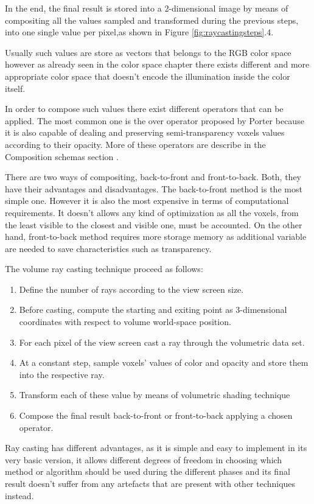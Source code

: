 \documentclass[12pt,a4paper]{extarticle}
\newcommand{\linespace}{\vspace{0pt}}
\begin{document}
In the end, the final result is stored into a 2-dimensional image by means of compositing all the values sampled and transformed during the previous steps, into one single value per pixel,as shown in Figure \ref{fig:raycastingsteps}.4.

Usually such values are store as vectors that belongs to the RGB color space%
however as already seen in the color space chapter there exists different and more appropriate color space that doesn't encode the illumination inside the color itself.
\linespace

In order to compose such values there exist different operators that can be applied. The most common one is the over operator proposed by Porter because it is also capable of dealing and preserving semi-transparency voxels values according to their opacity. More of these operators are describe in the Composition schemas section \cite{Porter1984Jan}.
\linespace

There are two ways of compositing, back-to-front and front-to-back. Both, they have their advantages and disadvantages. The back-to-front method is the most simple one. However it is also the most expensive in terms of computational requirements. It doesn't allows any kind of optimization as all the voxels, from the least visible to the closest and visible one, must be accounted.
On the other hand, front-to-back method requires more storage memory as additional variable are needed to save characteristics such as transparency.
\linespace

The volume ray casting technique proceed as follows:
\begin{enumerate}
\item Define the number of rays according to the view screen size.
\item Before casting, compute the starting and exiting point as 3-dimensional coordinates with respect to volume world-space position.
\item For each pixel of the view screen cast a ray through the volumetric data set.
\item At a constant step, sample voxels' values of color and opacity and store them into the respective ray.
\item Transform each of these value by means of volumetric shading technique
\item Compose the final result back-to-front or front-to-back applying a chosen operator.
\end{enumerate}

Ray casting has different advantages, as it is simple and easy to implement in its very basic version, it allows different degrees of freedom in choosing which method or algorithm should be used during the different phases and its final result doesn't suffer from any artefacts that are present with other techniques instead.
\end{document}

